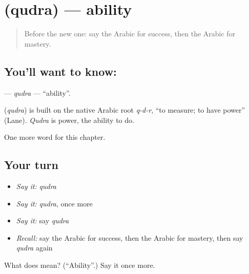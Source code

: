 \section[\texorpdfstring{\ar{قدرة} (qudra)}{قدرة (qudra)}]{ (qudra) — ability}

\label{lesson:AR-C106-qudra}



\begin{quote}
Before the new one: say the Arabic for success, then the Arabic for mastery.
\end{quote}

\subsection*{You'll want to know: }
\textbf{} — \emph{qudra} — \textquotedblleft{}ability\textquotedblright{}.

\begin{cousinweb}
\textbf{} (\emph{qudra}) is built on the native Arabic root \emph{q-d-r}, \textquotedblleft{}to measure; to have power\textquotedblright{} (Lane). \emph{Qudra} is power, the ability to do.
\end{cousinweb}

\begin{grammarlens}[title={What you've built}]
One more word for this chapter.
\end{grammarlens}

\subsection*{Your turn}
\begin{itemize}
\raggedright
  \item \emph{Say it:} \emph{qudra}
  \item \emph{Say it:} \emph{qudra}, once more
  \item \emph{Say it:} say \emph{qudra}
  \item \emph{Recall:} say the Arabic for success, then the Arabic for mastery, then say \emph{qudra} again
\end{itemize}

\begin{tcolorbox}[breakable,colback=teal!4,colframe=teal!35!black,title={Before you move on}]
What does  mean? (\textquotedblleft{}Ability\textquotedblright{}.) Say it once more.
\end{tcolorbox}
